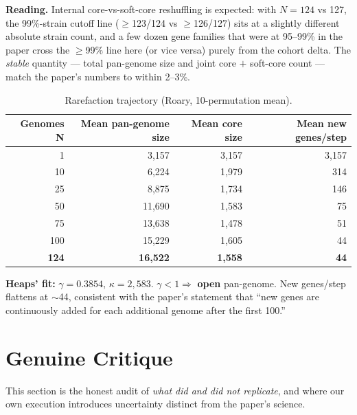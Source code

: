 \documentclass[11pt,letterpaper]{article}
\begin{document}
\textbf{Reading.} Internal core-vs-soft-core reshuffling is expected: with $N=124$ vs 127,
the 99\%-strain cutoff line ($\geq$123/124 vs $\geq$126/127) sits at a slightly different
absolute strain count, and a few dozen gene families that were at 95--99\% in the paper cross
the $\geq$99\% line here (or vice versa) purely from the cohort delta. The
\emph{stable} quantity --- total pan-genome size and joint core $+$ soft-core count --- match
the paper's numbers to within 2--3\%.

\begin{table}[h]
\centering
\begin{tabular}{rrrr}
\toprule
Genomes N & Mean pan-genome size & Mean core size & Mean new genes/step \\
\midrule
1   & 3{,}157  & 3{,}157 & 3{,}157 \\
10  & 6{,}224  & 1{,}979 & 314 \\
25  & 8{,}875  & 1{,}734 & 146 \\
50  & 11{,}690 & 1{,}583 & 75 \\
75  & 13{,}638 & 1{,}478 & 51 \\
100 & 15{,}229 & 1{,}605 & 44 \\
\textbf{124} & \textbf{16{,}522} & \textbf{1{,}558} & \textbf{44} \\
\bottomrule
\end{tabular}
\caption{Rarefaction trajectory (Roary, 10-permutation mean).}
\end{table}

\textbf{Heaps' fit:} $\gamma = 0.3854$, $\kappa = 2{,}583$. $\gamma < 1 \Rightarrow$
\textbf{open} pan-genome. New genes/step flattens at $\sim$44, consistent with the paper's
statement that ``new genes are continuously added for each additional genome after the first 100.''

\section{Genuine Critique}

This section is the honest audit of \emph{what did and did not replicate}, and where our
own execution introduces uncertainty distinct from the paper's science.
\end{document}
